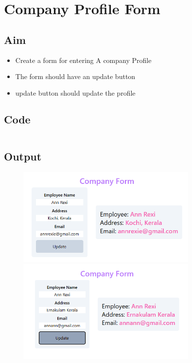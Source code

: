 \documentclass{article}
\begin{document}
\section{Company Profile Form}
\subsection{Aim}
\begin{itemize}
	\item Create a form for entering A company Profile
	\item The form should have an update button
	\item update button should update the profile
\end{itemize}

\subsection{Code}
\inputminted[frame=lines, linenos, breaklines, breakanywhere, numberblanklines=false]{html}{./prog_14/index.html}

\subsection{Output}
\begin{figure}[h!]
	\centering
	\includegraphics[width=0.8\textwidth]{./Assets/p1401.png}
	\includegraphics[width=0.8\textwidth]{./Assets/p1402.png}
\end{figure}
\newpage
\end{document}
